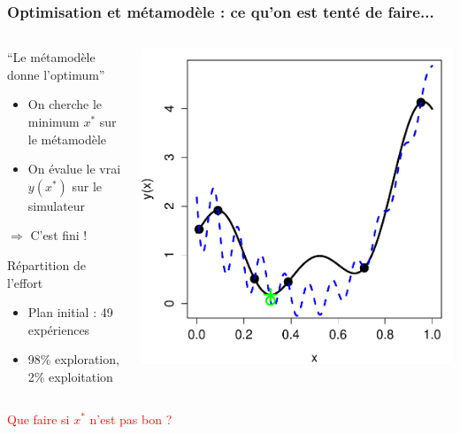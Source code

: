 \begin{frame}
\frametitle{Optimisation et métamodèle : ce qu'on est tenté de faire...}
\begin{columns}[l]
 \begin{column}{.51\textwidth}
  
\begin{block}{``Le métamodèle donne l'optimum''}
 \begin{itemize}
  \item On cherche le minimum $x^*$ sur le métamodèle
  \item On évalue le vrai $y(x^*)$ sur le simulateur
 \end{itemize}
$\Rightarrow$ C'est fini !
\end{block}

\begin{block}{Répartition de l'effort}
 \begin{itemize}
  \item Plan initial : 49 expériences
  \item 98\% exploration, 2\% exploitation
 \end{itemize}
\end{block}
 \end{column}
 \begin{column}{.49\textwidth}
  \includegraphics[width=\textwidth]{fig/exoptim1.pdf}
 \end{column}
\end{columns}
\vspace{1mm}
\centering
\textcolor{red}{Que faire si $x^*$ n'est pas bon ?}
\end{frame}

